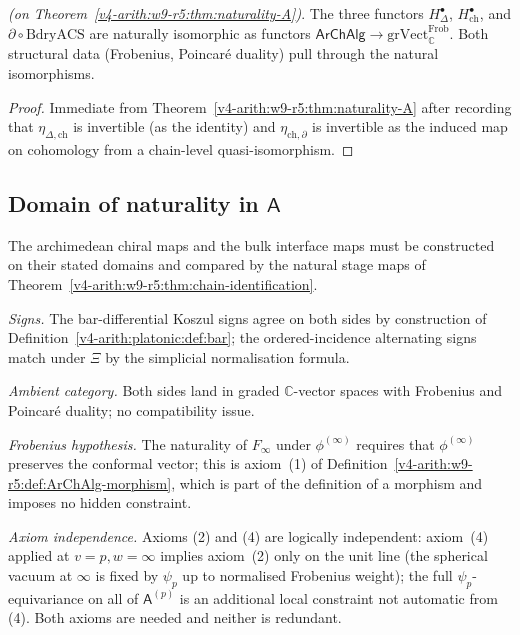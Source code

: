 \begin{corollary}
\label{v4-arith:w9-r5:cor:triple-A}
\ClaimStatusProvedHereConditional \emph{(on
Theorem~\ref{v4-arith:w9-r5:thm:naturality-A})}. The three functors
\(H^{\bullet}_{\Delta}\), \(H^{\bullet}_{\mathrm{ch}}\), and
\(\partial\circ\mathrm{BdryACS}\) are naturally isomorphic as
functors \(\mathsf{ArChAlg}\to\mathrm{grVect}_{\mathbb{C}}^{\mathrm{Frob}}\).
Both structural data (Frobenius, Poincar\'e duality) pull through
the natural isomorphisms.
\end{corollary}

\begin{proof}
Immediate from Theorem~\ref{v4-arith:w9-r5:thm:naturality-A} after recording
that \(\eta_{\Delta,\mathrm{ch}}\) is invertible (as the identity)
and \(\eta_{\mathrm{ch},\partial}\) is invertible as the induced
map on cohomology from a chain-level quasi-isomorphism.
\end{proof}

\subsection*{Domain of naturality in \(\mathsf{A}\)}
\label{v4-arith:w9-r5:ah:A}

The archimedean chiral maps and the bulk interface maps must be
constructed on their stated domains and compared by the natural stage
maps of Theorem~\ref{v4-arith:w9-r5:thm:chain-identification}.

\emph{Signs.} The bar-differential Koszul signs agree on both sides by
construction of Definition~\ref{v4-arith:platonic:def:bar}; the
ordered-incidence alternating signs match under \(\Xi\) by the
simplicial normalisation formula.

\emph{Ambient category.} Both sides land in graded \(\mathbb{C}\)-vector
spaces with Frobenius and Poincar\'e duality; no compatibility issue.

\emph{Frobenius hypothesis.} The naturality of \(F_{\infty}\) under
\(\phi^{(\infty)}\) requires that \(\phi^{(\infty)}\) preserves the
conformal vector; this is axiom~(1) of
Definition~\ref{v4-arith:w9-r5:def:ArChAlg-morphism}, which is part of the
definition of a morphism and imposes no hidden constraint.

\emph{Axiom independence.} Axioms (2) and (4) are logically
independent: axiom~(4) applied at \(v=p, w=\infty\) implies axiom~(2)
only on the unit line (the spherical vacuum at \(\infty\) is fixed by
\(\psi_{p}\) up to normalised Frobenius weight); the full
\(\psi_{p}\)-equivariance on all of \(\mathsf{A}^{(p)}\) is an
additional local constraint not automatic from (4). Both axioms are
needed and neither is redundant.

